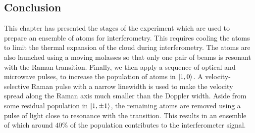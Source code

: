 \subsection{Conclusion}
This chapter has presented the stages of the experiment which are used to prepare an ensemble of atoms for interferometry. This requires cooling the atoms to limit the thermal expansion of the cloud during interferometry. The atoms are also launched using a moving molasses so that only one pair of beams is resonant with the Raman transition. Finally, we then apply a sequence of optical and microwave pulses, to increase the population of atoms in \(\ket{1,0}\). A velocity-selective Raman pulse with a narrow linewidth is used to make the velocity spread along the Raman axis much smaller than the Doppler width. Aside from some residual population in \(\ket{1,\pm 1}\), the remaining atoms are removed using a pulse of light close to resonance with the  transition. This results in an ensemble of which around \(40\%\) of the population contributes to the interferometer signal.

